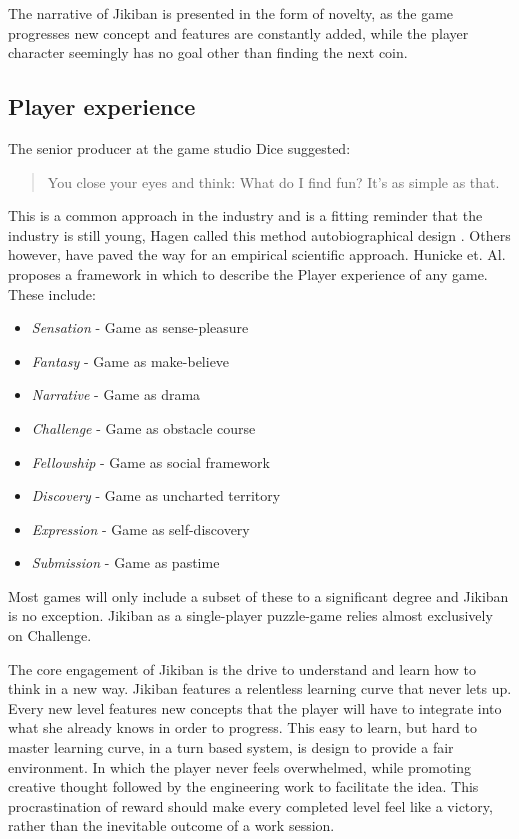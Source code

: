 The narrative of Jikiban is presented in the form of novelty, as the
game progresses new concept and features are constantly added, while
the player character seemingly has no goal other than finding the next
coin.

\subsection{Player experience}
The senior producer at the game studio Dice suggested\cite{hagen10}:

\begin{quotation}
You close your eyes and think: What do I find fun? It’s as simple as that.
\end{quotation}

This is a common approach in the industry and is a fitting reminder
that the industry is still young, Hagen called this method
autobiographical design \cite{hagen10}. Others however, have paved the
way for an empirical scientific approach. Hunicke et. Al.  proposes a
framework in which to describe the Player experience of any
game\cite{hunicke01-04}. These include:

\begin{itemize}
\item \emph{Sensation} - Game as sense-pleasure
\item \emph{Fantasy} - Game as make-believe
\item \emph{Narrative} - Game as drama
\item \emph{Challenge} - Game as obstacle course

\item \emph{Fellowship} %
 - Game as social framework %
\item \emph{Discovery} - Game as uncharted territory
\item \emph{Expression} - Game as self-discovery
\item \emph{Submission} - Game as pastime
\end{itemize}

Most games will only include a subset of these to a significant degree
and Jikiban is no exception. Jikiban as a single-player puzzle-game
relies almost exclusively on Challenge.

The core engagement of Jikiban is the drive to understand and learn
how to think in a new way. Jikiban features a relentless learning
curve that never lets up. Every new level features new concepts that
the player will have to integrate into what she already knows in order
to progress. This easy to learn, but hard to master learning curve, in
a turn based system, is design to provide a fair environment. In which
the player never feels overwhelmed, while promoting creative thought
followed by the engineering work to facilitate the idea. This
procrastination of reward should make every completed level feel like
a victory, rather than the inevitable outcome of a work session.

